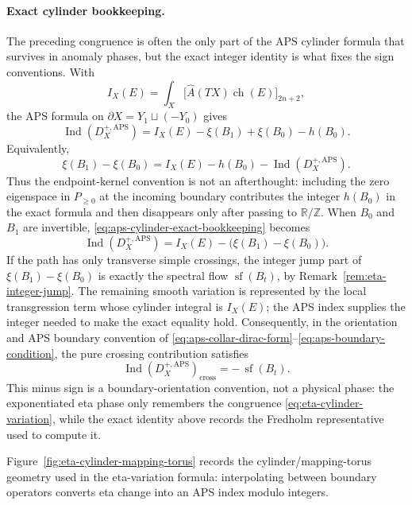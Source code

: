 \paragraph{Exact cylinder bookkeeping.}
The preceding congruence is often the only part of the APS cylinder formula
that survives in anomaly phases, but the exact integer identity is what fixes
the sign conventions.  With
\[
  I_X(E)
  =
  \int_X
  \bigl[\widehat A(TX)\operatorname{ch}(E)\bigr]_{2n+2},
\]
the APS formula on \(\partial X=Y_1\sqcup(-Y_0)\) gives
\begin{equation}
  \operatorname{Ind}(D_X^{+,\mathrm{APS}})
  =
  I_X(E)-\xi(B_1)+\xi(B_0)-h(B_0).
  \label{eq:aps-cylinder-exact-bookkeeping}
\end{equation}
Equivalently,
\begin{equation}
  \xi(B_1)-\xi(B_0)
  =
  I_X(E)-h(B_0)-\operatorname{Ind}(D_X^{+,\mathrm{APS}}).
  \label{eq:aps-cylinder-xi-exact-bookkeeping}
\end{equation}
Thus the endpoint-kernel convention is not an afterthought: including the
zero eigenspace in \(P_{\ge0}\) at the incoming boundary contributes the
integer \(h(B_0)\) in the exact formula and then disappears only after
passing to \(\mathbb R/\mathbb Z\).  When \(B_0\) and \(B_1\) are invertible,
\eqref{eq:aps-cylinder-exact-bookkeeping} becomes
\[
  \operatorname{Ind}(D_X^{+,\mathrm{APS}})
  =
  I_X(E)-\bigl(\xi(B_1)-\xi(B_0)\bigr).
\]
If the path has only transverse simple crossings, the integer jump part of
\(\xi(B_1)-\xi(B_0)\) is exactly the spectral flow
\(\operatorname{sf}(B_t)\), by Remark~\ref{rem:eta-integer-jump}.  The
remaining smooth variation is represented by the local transgression term
whose cylinder integral is \(I_X(E)\); the APS index supplies the integer
needed to make the exact equality hold.
Consequently, in the orientation and APS boundary convention of
\eqref{eq:aps-collar-dirac-form}--\eqref{eq:aps-boundary-condition}, the
pure crossing contribution satisfies
\[
  \operatorname{Ind}(D_X^{+,\mathrm{APS}})_{\mathrm{cross}}
  =
  -\,\operatorname{sf}(B_t).
\]
This minus sign is a boundary-orientation convention, not a physical phase:
the exponentiated eta phase only remembers the congruence
\eqref{eq:eta-cylinder-variation}, while the exact identity above records the
Fredholm representative used to compute it.

Figure~\ref{fig:eta-cylinder-mapping-torus} records the cylinder/mapping-torus
geometry used in the eta-variation formula: interpolating between boundary
operators converts eta change into an APS index modulo integers.

